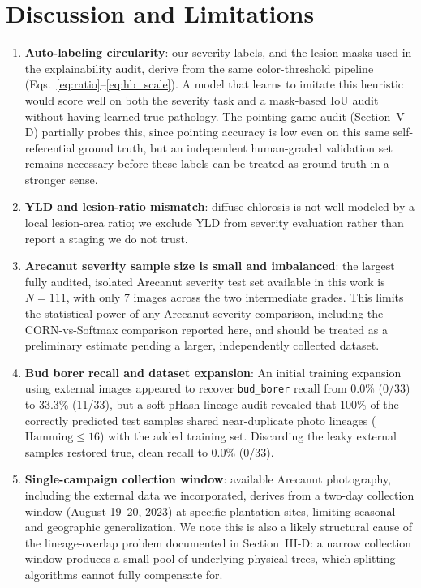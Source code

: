 \documentclass[conference]{IEEEtran}
\begin{document}
\section{Discussion and Limitations}
\begin{enumerate}
    \item \textbf{Auto-labeling circularity}: our severity labels, and the lesion masks used in the explainability audit, derive from the same color-threshold pipeline (Eqs.~\ref{eq:ratio}--\ref{eq:hb_scale}). A model that learns to imitate this heuristic would score well on both the severity task and a mask-based IoU audit without having learned true pathology. The pointing-game audit (Section~V-D) partially probes this, since pointing accuracy is low even on this same self-referential ground truth, but an independent human-graded validation set remains necessary before these labels can be treated as ground truth in a stronger sense.
    \item \textbf{YLD and lesion-ratio mismatch}: diffuse chlorosis is not well modeled by a local lesion-area ratio; we exclude YLD from severity evaluation rather than report a staging we do not trust.
    \item \textbf{Arecanut severity sample size is small and imbalanced}: the largest fully audited, isolated Arecanut severity test set available in this work is $N=111$, with only 7 images across the two intermediate grades. This limits the statistical power of any Arecanut severity comparison, including the CORN-vs-Softmax comparison reported here, and should be treated as a preliminary estimate pending a larger, independently collected dataset.
    \item \textbf{Bud borer recall and dataset expansion}: An initial training expansion using external images appeared to recover \texttt{bud\_borer} recall from 0.0\% (0/33) to 33.3\% (11/33), but a soft-pHash lineage audit revealed that 100\% of the correctly predicted test samples shared near-duplicate photo lineages ($\text{Hamming} \le 16$) with the added training set. Discarding the leaky external samples restored true, clean recall to 0.0\% (0/33).
    \item \textbf{Single-campaign collection window}: available Arecanut photography, including the external data we incorporated, derives from a two-day collection window (August 19--20, 2023) at specific plantation sites, limiting seasonal and geographic generalization. We note this is also a likely structural cause of the lineage-overlap problem documented in Section~III-D: a narrow collection window produces a small pool of underlying physical trees, which splitting algorithms cannot fully compensate for.

\end{enumerate}
\end{document}
